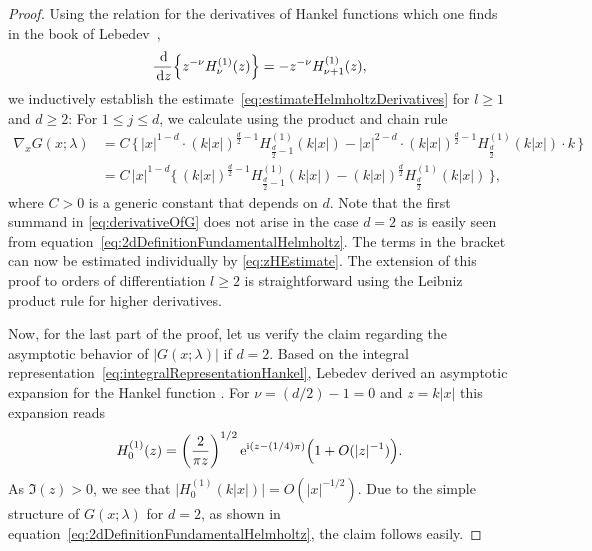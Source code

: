 \begin{proof}
  Using the relation for the derivatives of Hankel functions which one finds in the book of Lebedev~\cite[Eq.\@~(5.6.3)]{lebedev},
  \begin{align*}
    \frac{\, {\operatorname{d}\!{}}}{\, {\operatorname{d}\!{z}}} \Big\{ z^{-\nu} H_\nu^{(1)}(z) \Big\} = -z^{-\nu} H_{\nu + 1}^{(1)} (z),
  \end{align*}
  we inductively establish the estimate~\eqref{eq:estimateHelmholtzDerivatives} for $l \geq 1$ and $d \geq 2$:
  For $1 \leq j \leq d$, we calculate using the product and chain rule 
  \begin{align}
    \label{eq:derivativeOfG}
    \nabla_x^{} G(x; \lambda)
    &= C  \, \Big\{\, |x|^{1 - d} \cdot (k|x|)^{\frac{d}{2} - 1} H_{\frac{d}{2} - 1}^{(1)}(k|x|) 
       - |x|^{2 - d} \cdot (k|x|)^{\frac{d}{2} - 1} H_{\frac{d}{2}}^{(1)}(k|x|) \cdot k \, \Big\} \nonumber\\[0.5em]
    &= C \, |x|^{1 - d}\Big\{\,(k|x|)^{\frac{d}{2} - 1} H_{\frac{d}{2} - 1}^{(1)}(k|x|) -  (k|x|)^{\frac{d}{2}} H_{\frac{d}{2}}^{(1)}(k|x|) \, \Big\},
  \end{align}
  where $C > 0$ is a generic constant that depends on $d$. 
  Note that the first summand in \eqref{eq:derivativeOfG} does not arise in the case $d = 2$ as is easily seen from equation~\eqref{eq:2dDefinitionFundamentalHelmholtz}.
  The terms in the bracket can now be estimated individually by \eqref{eq:zHEstimate}.
  The extension of this proof to orders of differentiation $l \geq 2$ is straightforward using the Leibniz product rule for higher derivatives.

  Now, for the last part of the proof, let us verify the claim regarding the asymptotic behavior of $|G(x; \lambda)|$ if $d = 2$.
  Based on the integral representation~\eqref{eq:integralRepresentationHankel}, Lebedev derived an asymptotic expansion for the Hankel function \cite[Sec.\@~5.11, Eq.\@~(5.11.3)]{lebedev}. 
  For $\nu = (d/2) - 1 = 0$ and $z = k|x|$ this expansion reads
  \begin{align*}
    H_0^{(1)}(z) = \left(\frac{2}{\pi z}\right)^{1/2} \mathrm{e}^{\mathrm{i} (z - (1/4) \pi)} \Big( 1 + O(|z|^{-1})\Big).
  \end{align*}
  As $\Im(z) > 0$, we see that $\big|H_0^{(1)}(k |x|)\big| = O(|x|^{-1/2})$.
  Due to the simple structure of $G(x; \lambda)$ for $d = 2$, as shown in equation~\eqref{eq:2dDefinitionFundamentalHelmholtz}, the claim follows easily.
\end{proof}


